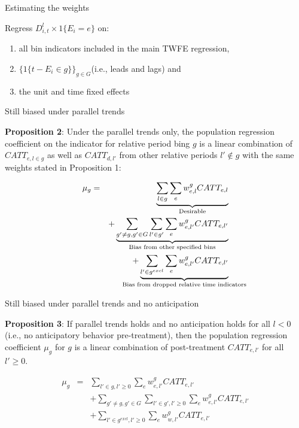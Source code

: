 \documentclass{beamer}
\begin{document}
\begin{frame}{Estimating the weights}

Regress $D^l_{i,t} \times 1\{E_i=e \}$ on:

\begin{enumerate}
\item all bin indicators included in the main TWFE regression, 
\item $\{ 1\{ t-E_i \in g \} \}_{g \in G}$(i.e., leads and lags) and 
\item the unit and time fixed effects
\end{enumerate}

\end{frame}


\begin{frame}{Still biased under parallel trends}

\textbf{Proposition 2}: Under the parallel trends only, the population regression coefficient on the indicator for relative period bing $g$ is a linear combination of $CATT_{e,l \in g}$ as well as $CATT_{d,l'}$ from other relative periods $l' \notin g$ with the same weights stated in Proposition 1:

\begin{eqnarray*}
\mu_g &=& \underbrace{\sum_{l \in g} \sum_e w^g_{e,l} CATT_{e,l}}_{\mathclap{\text{Desirable}}} \\
&& + \underbrace{\sum_{g' \neq g, g' \in G} \sum_{l' \in g'} \sum_e w^g_{e,l'}  CATT_{e,l'}}_{\mathclap{\text{Bias from other specified bins}}} \\
&&+ \underbrace{\sum_{l' \in g^{excl}} \sum_e w^g_{e,l'} CATT_{e,l'}}_{\mathclap{\text{Bias from dropped relative time indicators}}}
\end{eqnarray*}



\end{frame}


\begin{frame}{Still biased under parallel trends and no anticipation}

\textbf{Proposition 3}: If parallel trends holds and no anticipation holds for all $l<0$ (i.e., no anticipatory behavior pre-treatment), then the population regression coefficient $\mu_g$ for $g$ is a linear combination of post-treatment $CATT_{e,l'}$ for all $l' \geq 0$.

\begin{eqnarray*}
\mu_g &=& \sum_{l' \in g, l' \geq 0} \sum_e w^g_{e,l'} CATT_{e,l'} \\
&&+ \sum_{g' \neq g,g' \in G} \sum_{l' \in g', l' \geq 0} \sum_e w^g_{e,l'} CATT_{e,l'} \\
&&+ \sum_{l' \in g^{excl},l' \geq 0} \sum_e w^g_{w,l'} CATT_{e,l'}
\end{eqnarray*}

\end{frame}
\end{document}
